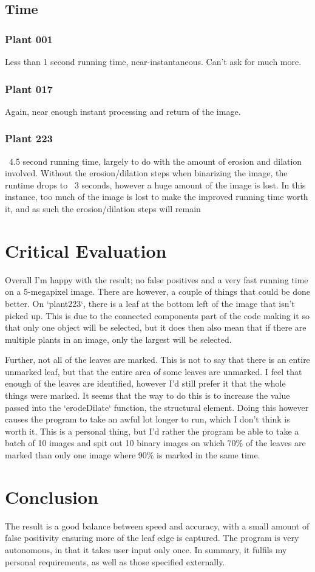 \documentclass[12pt]{article}
\begin{document}
\subsection{Time}
\subsubsection{Plant 001}
Less than 1 second running time, near-instantaneous. Can't ask for much more.

\subsubsection{Plant 017}
Again, near enough instant processing and return of the image.

\subsubsection{Plant 223}
~4.5 second running time, largely to do with the amount of erosion and dilation involved. Without the erosion/dilation steps when binarizing the image, the runtime
drops to ~3 seconds, however a huge amount of the image is lost. In this instance, too much of the image is lost to make the improved running time worth it, and as
such the erosion/dilation steps will remain

\section{Critical Evaluation}
Overall I'm happy with the result; no false positives and a very fast running time on a 5-megapixel image.
There are however, a couple of things that could be done better. On `plant223`, there is a leaf at the bottom
left of the image that isn't picked up. This is due to the connected components part of the code making it so
that only one object will be selected, but it does then also mean that if there are multiple plants in
an image, only the largest will be selected.

Further, not all of the leaves are marked.
This is not to say that there is an entire unmarked leaf, but that the entire area of some leaves are unmarked.
I feel that enough of the leaves are identified, however I'd still prefer it that the whole things were marked.
It seems that the way to do this is to increase the value passed into the `erodeDilate` function, the structural
element.
Doing this however causes the program to take an awful lot longer to run, which I don't think is worth it.
This is a personal thing, but I'd rather the program be able to take a batch of 10 images and spit out 10 binary images
on which 70\% of the leaves are marked than only one image where 90\% is marked in the same time.

\section{Conclusion}
The result is a good balance between speed and accuracy, with a small amount of false positivity ensuring more of the leaf edge is captured.
The program is very autonomous, in that it takes user input only once. In summary, it fulfils my personal requirements, as well as those specified externally.
\end{document}
